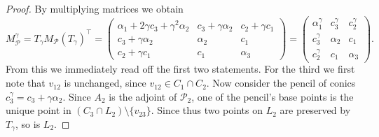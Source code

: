 \documentclass[10pt,a4paper]{amsart}
\newcommand{\cP}{{\mathcal P}}
\begin{document}
\begin{proof}
 By multiplying matrices we obtain
 \begin{equation*}
     M_\cP^\gamma = T_\gamma M_{\cP}(T_\gamma)^\top = \begin{pmatrix}
         \alpha_1 + 2\gamma c_3 + \gamma^2 \alpha_2 & c_3 + \gamma \alpha_2 & c_2 + \gamma c_1 \\
         c_3 + \gamma \alpha_2 & \alpha_2 & c_1 \\
         c_2 + \gamma c_1 & c_1 & \alpha_3
     \end{pmatrix} = \begin{pmatrix}
         \alpha_1^\gamma & c_3^\gamma & c_2^\gamma \\
         c_3^\gamma & \alpha_2 & c_1 \\
         c_2^\gamma & c_1 & \alpha_3
     \end{pmatrix}.
 \end{equation*}
 From this we immediately read off the first two statements. For the third we first note that $v_{12}$ is unchanged, since $v_{12} \in C_1 \cap C_2$. Now consider the pencil of conics $c_3^\gamma = c_3 + \gamma \alpha_2$. Since $A_2$ is the adjoint of $\cP_2$, one of the pencil's base points is the unique point in $(C_3 \cap L_2) \setminus \{v_{23}\}$. Since thus two points on $L_2$ are preserved by $T_\gamma$, so is $L_2$.
\end{proof}
\end{document}
